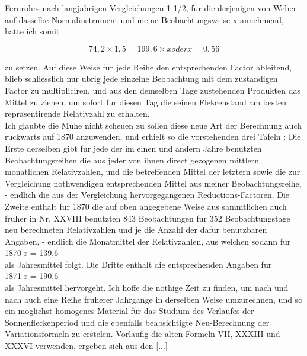 \documentclass[12pt]{article}
\begin{document}
Fernrohrs nach langjahrigen Vergleichungen 1 1/2, fur die derjenigen von Weber auf dasselbe Normalinstrument und meine Beobachtungsweise x annehmend, hatte ich somit

$$74,2 \times 1,5 = 199,6 \times x oder x = 0,56$$

zu setzen. Auf diese Weise fur jede Reihe den entsprechenden Factor ableitend, blieb schliesslich nur ubrig jede einzelne Beobachtung mit dem zustandigen Factor zu multipliciren, und aus den demselben Tage zustehenden Produkten das Mittel zu ziehen, um sofort fur diesen Tag die seinen Flekcenstand am besten reprasentirende Relativzahl zu erhalten.\\

Ich glaubte die Muhe nicht scheuen zu sollen diese neue Art der Berechnung auch ruckwarts auf 1870 anzuwenden, und erhielt so die vorstehenden drei Tafeln : Die Erste derselben gibt fur jede der im einen und andern Jahre benutzten Beobachtungsreihen die aus jeder von ihnen direct gezogenen mittlern monatlichen Relativzahlen, und die betreffenden Mittel der letztern sowie die zur Vergleichung nothwendigen entsprechenden Mittel aus meiner Beobachtungsreihe, - endlich die aus der Vergleichung hervorgegangenen Reductions-Factoren. Die Zweite enthalt fur 1870 die auf oben angegebene Weise aus sammtlichen auch fruher in Nr. XXVIII benutzten 843 Beobachtungen fur 352 Beobachtungstage neu berechneten Relativzahlen und je die Anzahl der dafur benutzbaren Angaben, - endlich die Monatmittel der Relativzahlen, aus welchen sodann fur\\

1870 r = 139,6\\

als Jahresmittel folgt. Die Dritte enthalt die entsprechenden Angaben fur \\

1871 r = 190,6\\

als Jahresmittel hervorgeht. Ich hoffe die nothige Zeit zu finden, um nach und nach auch eine Reihe fruherer Jahrgange in derselben Weise umzurechnen, und so ein moglichst homogenes Material fur das Studium des Verlaufes der Sonnenfleckenperiod und die ebenfalls beabsichtigte Neu-Berechnung der Variationsformeln zu erstelen. Vorlaufig die alten Formeln VII, XXXIII und XXXVI verwenden, ergeben sich aus den [...]\\

\\ 
\end{document}
